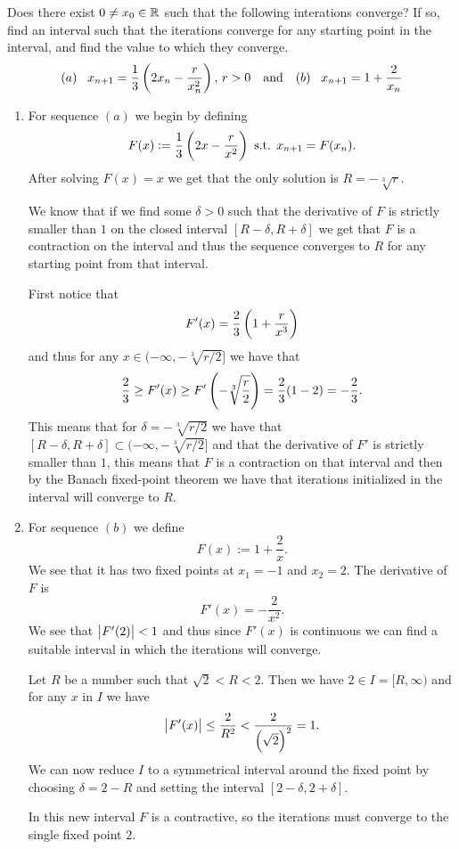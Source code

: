 \documentclass[11pt, a4paper]{article}
\begin{document}
\begin{exercise}
  Does there exist $0 \neq x_0 \in \mathbb{R}$ such that the following interations
  converge? If so, find an interval such that the iterations converge
  for any starting point in the interval, and find the value to which they
  converge.
  \[
    (a)\quad\! x_{n+1} = \frac{1}{3} \del{2 x_n - \frac{r}{x_n^2}},\, r >0 \tand
    (b)\quad\! x_{n+1} = 1 + \frac{2}{x_n}
  \]
\end{exercise}
\begin{solution} \phantom{}
\begin{enumerate}
\item[(a)]
  For sequence $(a)$ we begin by defining
  \[
    F(x) := \frac{1}{3} \del{2 x - \frac{r}{x^2}} \st x_{n+1} = F(x_n).
  \]
  After solving $F(x) = x$ we get that the only solution is
  $R = - \sqrt[3]{r}$.

  We know that if we find some $\delta > 0$ such that the derivative of $F$ is
  strictly smaller than $1$ on the closed interval $[R - \delta, R + \delta]$
  we get that $F$ is a contraction on the interval and thus the sequence
  converges to $R$ for any starting point from that interval.

  First notice that
  \[
    F'(x) = \frac{2}{3} \del{1 + \frac{r}{x^3}}
  \]
  and thus for any $x \in (-\infty, -\sqrt[3]{r / 2}]$ we have that
  \[
    \frac{2}{3} \geq
    F'(x) \geq
    F'\del{- \sqrt[3]{\frac{r}{2}}} =
    \frac{2}{3} (1 - 2) =
    - \frac{2}{3}.
  \]
  This means that for $\delta = -\sqrt[3]{r / 2}$ we have that
  $[R - \delta, R + \delta] \subset (-\infty, -\sqrt[3]{r / 2}]$ and
  that the derivative of $F'$ is strictly smaller than $1$, this means
  that $F$ is a contraction on that interval and then by the Banach fixed-point
  theorem we have that iterations initialized in the interval will converge
  to $R$.
\item[(b)] For sequence $(b)$ we define
  \[
    F(x) := 1 + \frac{2}{x}.
  \]
  We see that it has two fixed points at $x_1 = -1$ and $x_2 = 2$.
  The derivative of $F$ is
  \[
    F'(x) = - \frac{2}{x^2}.
  \]
  We see that $\left\lvert F'(2)\right\rvert < 1$ and thus since $F'(x)$ is continuous we
  can find a suitable interval in which the iterations will converge.

  Let $R$ be a number such that $\sqrt 2 < R < 2$.
  Then we have $2 \in I = [R,\infty)$ and for any $x$ in $I$ we have
  \[
    \abs{F'(x)} \le
    \frac{2}{R^2} <
    \frac{2}{\del{\sqrt 2}^2} = 1.
  \]
  We can now reduce $I$ to a symmetrical interval around the
  fixed point by choosing $\delta = 2 - R$ and setting the interval
  $[2 - \delta, 2 + \delta]$.

  In this new interval $F$ is a contractive, so the iterations must converge
  to the single fixed point $2$.
\end{enumerate}
\end{solution}
\end{document}
